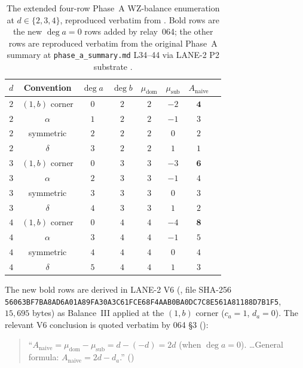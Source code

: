 \documentclass[11pt,reqno]{amsart}
\theoremstyle{plain}
\theoremstyle{definition}
\theoremstyle{remark}
\newcommand{\Anaive}{A_{\mathrm{naive}}}
\newcommand{\dega}{\deg a}
\newcommand{\degb}{\deg b}
\begin{document}
\begin{table}[h]
\centering
\small
\begin{tabular}{cccccccc}
\toprule
$d$ & Convention & $\dega$ & $\degb$
    & $\mu_{\mathrm{dom}}$ & $\mu_{\mathrm{sub}}$ & $\Anaive$ \\
\midrule
$2$ & $(1, b)$ corner & $0$ & $2$ & $2$ & $-2$ & $\mathbf{4}$ \\
$2$ & $\alpha$        & $1$ & $2$ & $2$ & $-1$ & $3$ \\
$2$ & symmetric       & $2$ & $2$ & $2$ &  $0$ & $2$ \\
$2$ & $\delta$        & $3$ & $2$ & $2$ &  $1$ & $1$ \\
\midrule
$3$ & $(1, b)$ corner & $0$ & $3$ & $3$ & $-3$ & $\mathbf{6}$ \\
$3$ & $\alpha$        & $2$ & $3$ & $3$ & $-1$ & $4$ \\
$3$ & symmetric       & $3$ & $3$ & $3$ &  $0$ & $3$ \\
$3$ & $\delta$        & $4$ & $3$ & $3$ &  $1$ & $2$ \\
\midrule
$4$ & $(1, b)$ corner & $0$ & $4$ & $4$ & $-4$ & $\mathbf{8}$ \\
$4$ & $\alpha$        & $3$ & $4$ & $4$ & $-1$ & $5$ \\
$4$ & symmetric       & $4$ & $4$ & $4$ &  $0$ & $4$ \\
$4$ & $\delta$        & $5$ & $4$ & $4$ &  $1$ & $3$ \\
\bottomrule
\end{tabular}
\caption{The extended four-row Phase~A WZ-balance enumeration
at $d \in \{2, 3, 4\}$, reproduced verbatim from
\cite[\S 2.3, L102--118]{phase_a_deg_a_zero_064}. Bold rows are
the new $\dega = 0$ rows added by relay~064; the other rows
are reproduced verbatim from the original Phase~A summary at
\texttt{phase\_a\_summary.md} L34--44 via LANE-2 P2 substrate
\cite[L77--87]{lane2_independent_depth_probe}.}
\label{tab:fourrow}
\end{table}

The new bold rows are derived in LANE-2 V6
(\cite[\S V6, L210--308]{lane2_independent_substrate_verification},
file SHA-256
\verb|56063BF7BA8AD6A01A89FA30A3C61FCE68F4AAB0BA0DC7C8E561A81188D7B1F5|,
$15{,}695$ bytes) as Balance~III applied at the $(1, b)$ corner
($c_a = 1$, $d_a = 0$). The relevant V6 conclusion is quoted
verbatim by 064 \S 3 (\cite[\S 3]{phase_a_deg_a_zero_064}):

\begin{quote}
``$\Anaive = \mu_{\mathrm{dom}} - \mu_{\mathrm{sub}} = d - (-d) =
2d$ (when $\dega = 0$). \dots General formula:
$\Anaive = 2d - d_a$.''
\hfill (\cite[V6 Step~4, L274--282]{lane2_independent_substrate_verification})
\end{quote}
\end{document}
